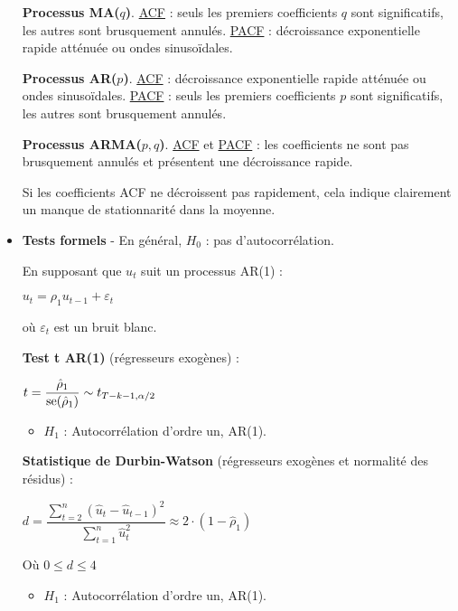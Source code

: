 \begin{f}[Détection]
\begin{itemize}[leftmargin=*]
	
	\textbf{Processus MA(\(q\))}. \underline{ACF} : seuls les premiers coefficients \(q\) sont significatifs, les autres sont brusquement annulés. \underline{PACF} : décroissance exponentielle rapide atténuée ou ondes sinusoïdales.
	
	\textbf{Processus AR(\(p\))}. \underline{ACF} : décroissance exponentielle rapide atténuée ou ondes sinusoïdales. \underline{PACF} : seuls les premiers coefficients \(p\) sont significatifs, les autres sont brusquement annulés.

	
	\textbf{Processus ARMA(\(p, q\))}. \underline{ACF} et \underline{PACF} : les coefficients ne sont pas brusquement annulés et présentent une décroissance rapide.
	
	Si les coefficients ACF ne décroissent pas rapidement, cela indique clairement un manque de stationnarité dans la moyenne.
	
	\item \textbf{Tests formels} - En général, \(H_{0}\) : pas d'autocorrélation.
	
	En supposant que \(u_{t}\) suit un processus AR(1) :
	
	\begin{center}
		\(u_{t} = \rho_{1} u_{t - 1} + \varepsilon_{t}\)
	\end{center}
	
	où \(\varepsilon_{t}\) est un bruit blanc.
	
	\textbf{Test t AR(1)} (régresseurs exogènes) :
	
	\begin{center}
		\(t = \dfrac{\hat{\rho}_{1}}{\mathrm{se}(\hat{\rho}_{1})} \sim t_{T - k - 1, \alpha/2}\)
	\end{center}
	
	\begin{itemize}[leftmargin=*]
		\item \(H_{1}\) : Autocorrélation d'ordre un, AR(1).
	\end{itemize}
	
	\textbf{Statistique de Durbin-Watson} (régresseurs exogènes et normalité des résidus) :
	
	\begin{center}
		\(d = \dfrac{\sum_{t=2}^{n} (\hat{u}_{t} - \hat{u}_{t - 1})^{2}}{\sum_{t=1}^{n} \hat{u}_{t}^{2}} \approx 2 \cdot (1 - \hat{\rho}_{1})\)
	\end{center}
	
	Où \(0 \leq d \leq 4\)
	
	\begin{itemize}[leftmargin=*]
		\item \(H_{1}\) : Autocorrélation d'ordre un, AR(1).
	\end{itemize}
	

\end{itemize}
\end{f}

